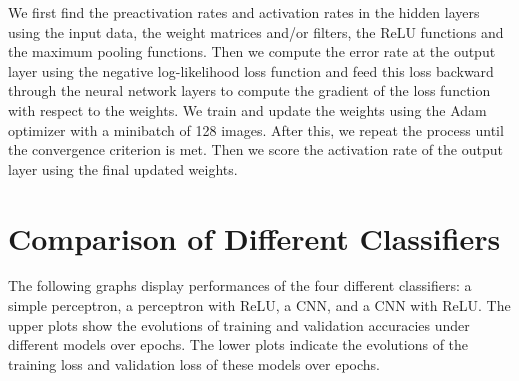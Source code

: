\documentclass[11pt]{amsart}
\begin{document}
We first find the preactivation rates and activation rates in the hidden layers using the input data, the weight matrices and/or filters, the ReLU functions and the maximum pooling functions.  Then we compute the error rate at the output layer using the negative log-likelihood loss function and feed this loss backward through the neural network layers to compute the gradient of the loss function with respect to the weights. We train and update the weights using the Adam optimizer with a minibatch of 128 images. After this, we repeat the process until the convergence criterion is met. Then we score the activation rate of the output layer using the final updated weights.



\section{Comparison of Different Classifiers}

The following graphs display performances of the four different classifiers: a simple perceptron, a perceptron with ReLU, a CNN, and a CNN with ReLU. The upper plots show the evolutions of training and validation accuracies under different models over epochs. The lower plots indicate the evolutions of the training loss and validation loss of these models over epochs.
\smallskip
\end{document}
